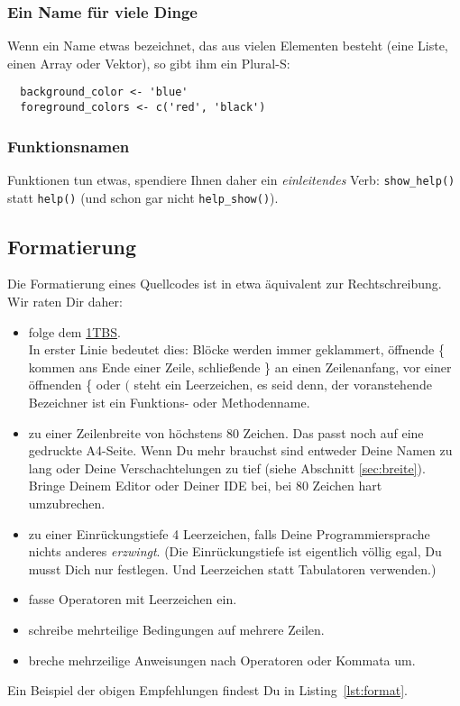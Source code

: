 \documentclass[twoside]{scrartcl}
\providecommand{\code}[1]{\texttt{#1}}
\begin{document}
\subsubsection{Ein Name f\"u{}r viele Dinge}
Wenn ein Name etwas bezeichnet, das aus vielen Elementen besteht (eine Liste,
einen Array oder Vektor), so gibt ihm ein Plural-S:
\begin{lstlisting}
  background_color <- 'blue'
  foreground_colors <- c('red', 'black')
\end{lstlisting}

\subsubsection{Funktionsnamen}
Funktionen tun etwas, spendiere Ihnen daher ein \emph{einleitendes} Verb:
\code{show\_help()} statt \code{help()} (und schon gar nicht  
\code{help\_show()}).

\subsection{Formatierung\label{sec:format}}
Die Formatierung eines Quellcodes ist in etwa \"a{}quivalent zur
Rechtschreibung. Wir raten Dir daher:
\begin{itemize}
\item folge dem
  \href{http://en.wikipedia.org/wiki/Indent_style#Variant:_1TBS}{1TBS}.\\
  In erster Linie bedeutet dies: Bl\"o{}cke werden immer geklammert,
  \"o{}ffnende \{ kommen ans Ende einer
  Zeile, schlie\ss{}ende \} an einen Zeilenanfang, vor einer
  \"o{}ffnenden \{ oder $($ steht ein Leerzeichen, es seid denn,
  der voranstehende Bezeichner ist ein Funktions- oder Methodenname.
\item zu einer Zeilenbreite von h\"o{}chstens 80 Zeichen. Das passt
  noch auf eine gedruckte A4-Seite. Wenn Du mehr brauchst sind
  entweder Deine Namen zu lang oder Deine Verschachtelungen zu
  tief (siehe Abschnitt \ref{sec:breite}).
  Bringe Deinem Editor oder Deiner IDE bei, bei 80 Zeichen hart
  umzubrechen.
\item zu einer Einr\"u{}ckungstiefe 4 Leerzeichen, falls Deine
  Programmiersprache nichts anderes \emph{erzwingt}.
  (Die Einr\"u{}ckungstiefe ist eigentlich v\"o{}llig egal, Du
  musst Dich nur festlegen. Und Leerzeichen statt
  Tabulatoren verwenden.)
\item fasse Operatoren mit Leerzeichen ein.
\item schreibe mehrteilige Bedingungen auf mehrere Zeilen.
\item breche mehrzeilige Anweisungen nach Operatoren oder Kommata
  um.
\end{itemize}
Ein Beispiel der obigen Empfehlungen 
findest Du in Listing~\ref{lst:format}.

\end{document}
